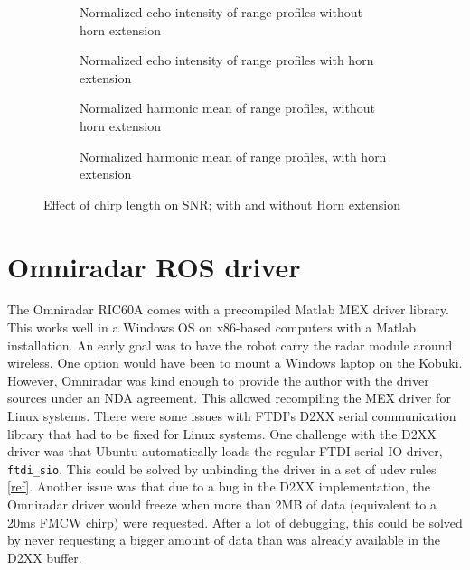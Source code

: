 \begin{figure}[htbp]
    \centering
    \label{fig:fig_compare_chirp_times}
    \begin{subfigure}{0.475 \textwidth}
        \centering
        \def\svgwidth{\linewidth} \small
        
        \caption{Normalized echo intensity of range profiles without horn extension}
        \bigskip
    \end{subfigure}
    \hfill
    \begin{subfigure}{0.475 \textwidth}
        \centering
        \def\svgwidth{\linewidth} \small
        
        \caption{Normalized echo intensity of range profiles with horn extension}
        \bigskip
    \end{subfigure}
    \begin{subfigure}{0.475 \textwidth}
        \centering
        \def\svgwidth{\linewidth} \small
        
        \caption{Normalized harmonic mean of range profiles, without horn extension}
    \end{subfigure}
    \hfill
    \begin{subfigure}{0.475 \textwidth}
        \centering
        \def\svgwidth{\linewidth} \small
        
        \caption{Normalized harmonic mean of range profiles, with horn extension}
    \end{subfigure}
    \caption{Effect of chirp length on SNR; with and without Horn extension}
\end{figure}


\section{Omniradar ROS driver}\label{omniradar-ros-driver}

The Omniradar RIC60A comes with a precompiled Matlab MEX driver library.
This works well in a Windows OS on x86-based computers with a Matlab
installation. An early goal was to have the robot carry the radar module
around wireless. One option would have been to mount a Windows laptop on
the Kobuki. However, Omniradar was kind enough to provide the author
with the driver sources under an NDA agreement. This allowed recompiling
the MEX driver for Linux systems. There were some issues with FTDI's
D2XX serial communication library that had to be fixed for Linux
systems. One challenge with the D2XX driver was that Ubuntu
automatically loads the regular FTDI serial IO driver,
\texttt{ftdi\_sio}. This could be solved by unbinding the driver in a
set of udev rules
\href{https://stackoverflow.com/questions/44529376}{{[}ref{]}}. Another
issue was that due to a bug in the D2XX implementation, the Omniradar
driver would freeze when more than 2MB of data (equivalent to a 20ms
FMCW chirp) were requested. After a lot of debugging, this could be
solved by never requesting a bigger amount of data than was already
available in the D2XX buffer.

